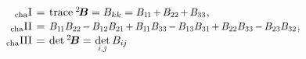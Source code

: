 \vspace{-0.25em}
\begin{equation}\label{invariants:2}
\begin{array}{r@{\hspace{.4em}}c@{\hspace{.4em}}l}
\firstcharacteristicinvariant
& = &
\trace{\somebivalenttensor} = \somebivalenttensorcomponents{kk}
= \scalebox{.92}[.96]{$%
\somebivalenttensorcomponents{1\hspace{-0.1ex}1}
\hspace{-0.2ex} + \hspace{-0.1ex}
\somebivalenttensorcomponents{22}
\hspace{-0.2ex} + \hspace{-0.1ex}
\somebivalenttensorcomponents{33} $}
\hspace{.1ex} ,
\\[.1em]
%
\secondcharacteristicinvariant
& = &
\scalebox{.92}[.96]{$ \somebivalenttensorcomponents{1\hspace{-0.1ex}1} \somebivalenttensorcomponents{22}
\hspace{-0.2ex} - \hspace{-0.1ex}
\somebivalenttensorcomponents{12} \somebivalenttensorcomponents{21}
\hspace{-0.2ex} + \hspace{-0.1ex}
\somebivalenttensorcomponents{1\hspace{-0.1ex}1} \somebivalenttensorcomponents{33}
\hspace{-0.2ex} - \hspace{-0.1ex}
\somebivalenttensorcomponents{13} \somebivalenttensorcomponents{31}
\hspace{-0.2ex} + \hspace{-0.1ex}
\somebivalenttensorcomponents{22} \somebivalenttensorcomponents{33}
\hspace{-0.2ex} - \hspace{-0.1ex}
\somebivalenttensorcomponents{23} \somebivalenttensorcomponents{32} $}
\hspace{.1ex} ,
\\[.1em]
%
\thirdcharacteristicinvariant
& = &
\determinant \hspace{.1ex} \somebivalenttensor
= \hspace{.15ex}
\underset{\raisebox{.15em}{%
   \scalebox{.7}{ $i$,$\hspace{.15ex}j$ }%
}}%
{\determinant} \, \somebivalenttensorcomponents{i\hspace{-0.1ex}j} \hspace{-0.15ex}

\end{array}
\end{equation}
